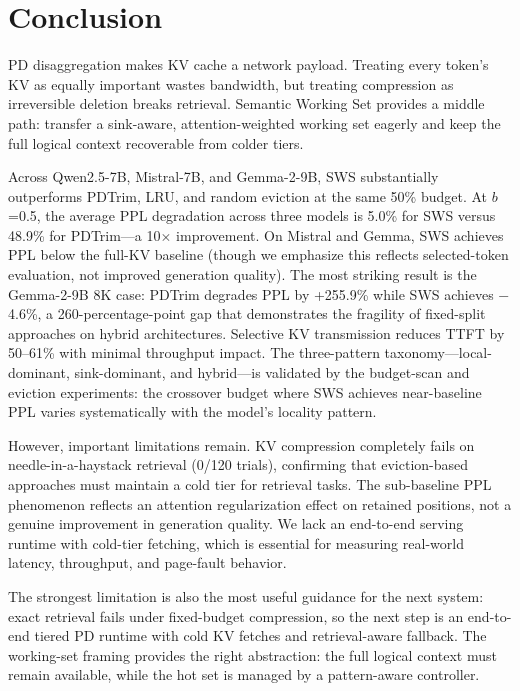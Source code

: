 \documentclass[11pt]{article}
\newcommand{\method}{SWS}
\newcommand{\fullmethod}{Semantic Working Set}
\newcommand{\sws}{SWS}
\newcommand{\pct}{\%}
\theoremstyle{definition}
\theoremstyle{plain}
\begin{document}
\section{Conclusion}
\label{sec:conclusion}

PD disaggregation makes KV cache a network payload.  Treating every token's KV as equally important wastes bandwidth, but treating compression as irreversible deletion breaks retrieval.  \fullmethod{} provides a middle path: transfer a sink-aware, attention-weighted working set eagerly and keep the full logical context recoverable from colder tiers.

Across Qwen2.5-7B, Mistral-7B, and Gemma-2-9B, \method{} substantially outperforms PDTrim, LRU, and random eviction at the same 50\pct{} budget.  At $b$=0.5, the average PPL degradation across three models is 5.0\pct{} for \sws{} versus 48.9\pct{} for PDTrim---a 10$\times$ improvement.  On Mistral and Gemma, \sws{} achieves PPL below the full-KV baseline (though we emphasize this reflects selected-token evaluation, not improved generation quality).  The most striking result is the Gemma-2-9B 8K case: PDTrim degrades PPL by +255.9\pct{} while \sws{} achieves $-$4.6\pct{}, a 260-percentage-point gap that demonstrates the fragility of fixed-split approaches on hybrid architectures.  Selective KV transmission reduces TTFT by 50--61\pct{} with minimal throughput impact.  The three-pattern taxonomy---local-dominant, sink-dominant, and hybrid---is validated by the budget-scan and eviction experiments: the crossover budget where \sws{} achieves near-baseline PPL varies systematically with the model's locality pattern.

However, important limitations remain.  KV compression completely fails on needle-in-a-haystack retrieval (0/120 trials), confirming that eviction-based approaches must maintain a cold tier for retrieval tasks.  The sub-baseline PPL phenomenon reflects an attention regularization effect on retained positions, not a genuine improvement in generation quality.  We lack an end-to-end serving runtime with cold-tier fetching, which is essential for measuring real-world latency, throughput, and page-fault behavior.

The strongest limitation is also the most useful guidance for the next system: exact retrieval fails under fixed-budget compression, so the next step is an end-to-end tiered PD runtime with cold KV fetches and retrieval-aware fallback.  The working-set framing provides the right abstraction: the full logical context must remain available, while the hot set is managed by a pattern-aware controller.
\end{document}
